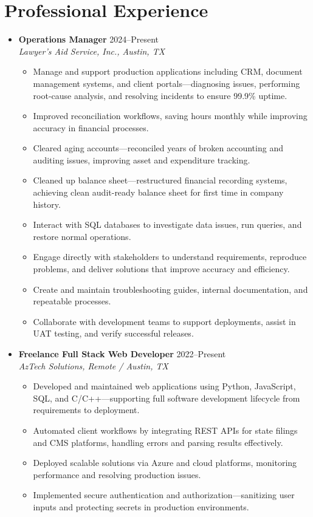 \documentclass[letterpaper,10pt]{article}
\newcommand{\resumeItem}[1]{\item \small{#1}}
\begin{document}
\section*{Professional Experience}
\begin{itemize}
  \item[]
    \textbf{Operations Manager} \hfill 2024--Present \\
    \textit{Lawyer's Aid Service, Inc., Austin, TX}
  \begin{itemize}
    \resumeItem{Manage and support production applications including CRM, document management systems, and client portals---diagnosing issues, performing root-cause analysis, and resolving incidents to ensure 99.9\% uptime.}
    \resumeItem{Improved reconciliation workflows, saving hours monthly while improving accuracy in financial processes.}
    \resumeItem{Cleared aging accounts---reconciled years of broken accounting and auditing issues, improving asset and expenditure tracking.}
    \resumeItem{Cleaned up balance sheet---restructured financial recording systems, achieving clean audit-ready balance sheet for first time in company history.}
    \resumeItem{Interact with SQL databases to investigate data issues, run queries, and restore normal operations.}
    \resumeItem{Engage directly with stakeholders to understand requirements, reproduce problems, and deliver solutions that improve accuracy and efficiency.}
    \resumeItem{Create and maintain troubleshooting guides, internal documentation, and repeatable processes.}
    \resumeItem{Collaborate with development teams to support deployments, assist in UAT testing, and verify successful releases.}
  \end{itemize}

  \item[]
    \textbf{Freelance Full Stack Web Developer} \hfill 2022--Present \\
    \textit{AzTech Solutions, Remote / Austin, TX}
  \begin{itemize}
    \resumeItem{Developed and maintained web applications using Python, JavaScript, SQL, and C/C++---supporting full software development lifecycle from requirements to deployment.}
    \resumeItem{Automated client workflows by integrating REST APIs for state filings and CMS platforms, handling errors and parsing results effectively.}
    \resumeItem{Deployed scalable solutions via Azure and cloud platforms, monitoring performance and resolving production issues.}
    \resumeItem{Implemented secure authentication and authorization---sanitizing user inputs and protecting secrets in production environments.}
  \end{itemize}


\end{itemize}
\end{document}

